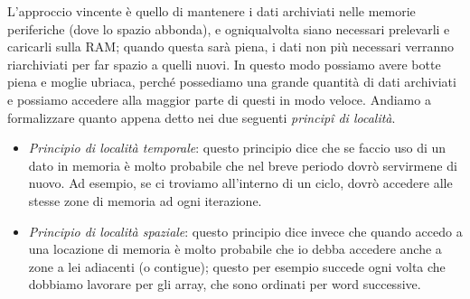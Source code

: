 \documentclass[class=book, crop=false, oneside]{standalone}
\begin{document}
L'approccio vincente è quello di mantenere i dati archiviati nelle memorie periferiche (dove lo spazio abbonda), e ogniqualvolta siano necessari prelevarli e caricarli sulla RAM; quando questa sarà piena, i dati non più necessari verranno riarchiviati per far spazio a quelli nuovi. In questo modo possiamo avere botte piena e moglie ubriaca, perché possediamo una grande quantità di dati archiviati e possiamo accedere alla maggior parte di questi in modo veloce. Andiamo a formalizzare quanto appena detto nei due seguenti \emph{principî di località}.
\begin{itemize}
  \item \emph{Principio di località temporale}: questo principio dice che se faccio uso di un dato in memoria è molto probabile che nel breve periodo dovrò servirmene di nuovo. Ad esempio, se ci troviamo all'interno di un ciclo, dovrò accedere alle stesse zone di memoria ad ogni iterazione.
  \item \emph{Principio di località spaziale}: questo principio dice invece che quando accedo a una locazione di memoria è molto probabile che io debba accedere anche a zone a lei adiacenti (o contigue); questo per esempio succede ogni volta che dobbiamo lavorare per gli array, che sono ordinati per word successive.
\end{itemize}
\end{document}
